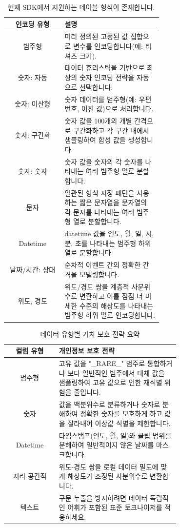 \begin{table}[!t]
\renewcommand{\arraystretch}{1.3}
\centering
\caption{현재 SDK에서 지원하는 테이블 형식이 존재합니다.}
\label{table:supported_encodings}
\begin{tabular}{|c||p{0.63\linewidth}|}
\hline
\textbf{인코딩 유형} & \textbf{설명} \\
\hline
범주형 & 미리 정의된 고정된 값 집합으로 변수를 인코딩합니다(예: 티셔츠 크기).\\
\hline
숫자: 자동 & 데이터 휴리스틱을 기반으로 최상의 숫자 인코딩 전략을 자동으로 선택합니다. \\
\hline
숫자: 이산형 & 숫자 데이터를 범주형(예: 우편번호, 이진 값)으로 처리합니다. \\
\hline
숫자: 구간화 & 숫자 값을 100개의 개별 간격으로 구간화하고 각 구간 내에서 샘플링하여 합성 값을 생성합니다.\\
\hline
숫자: 숫자 & 숫자 값을 숫자의 각 숫자를 나타내는 여러 범주형 열로 분할합니다. \\
\hline
문자 & 일관된 형식 지정 패턴을 사용하는 짧은 문자열을 문자열의 각 문자를 나타내는 여러 범주형 열로 분할합니다. \\
\hline
Datetime & datetime 값을 연도, 월, 일, 시, 분, 초를 나타내는 범주형 하위 열로 분할합니다. \\
\hline
날짜/시간: 상대 & 순차적 이벤트 간의 정확한 간격을 모델링합니다.\\
\hline
위도, 경도 & 위도/경도 쌍을 계층적 사분위수로 변환하고 이를 점점 더 미세한 수준의 해상도를 나타내는 범주형 하위 열로 인코딩합니다.\\
\hline
\end{tabular}
\end{table}


\begin{table}[t]
\renewcommand{\arraystretch}{1.3}
\centering
\caption{데이터 유형별 가치 보호 전략 요약}
\label{table:privacy_strategies}
\begin{tabular}{|c||p{0.7\linewidth}|}
\hline
\textbf{컬럼 유형} & \textbf{개인정보 보호 전략} \\
\hline
범주형 & 고유 값을 "\_RARE\_" 범주로 통합하거나 보다 일반적인 범주에서 대체 값을 샘플링하여 고유 값으로 인한 재식별 위험을 줄입니다. \\
\hline
숫자 & 값을 백분위수로 분류하거나 숫자로 분해하여 정확한 숫자를 모호하게 하고 값을 잘라내어 이상값 식별을 제한합니다. \\
\hline
Datetime & 타임스탬프(연도, 월, 일)와 클립 범위를 분해하여 일반적이지 않은 날짜를 마스크합니다. \\
\hline
지리 공간적 & 위도-경도 쌍을 로컬 데이터 밀도에 맞게 해상도가 조정된 사분위수로 변환합니다. \\
\hline
텍스트 & 구문 누출을 방지하려면 데이터 독립적인 어휘가 포함된 표준 토크나이저를 적용하세요.\\
\hline
\end{tabular}
\end{table}



